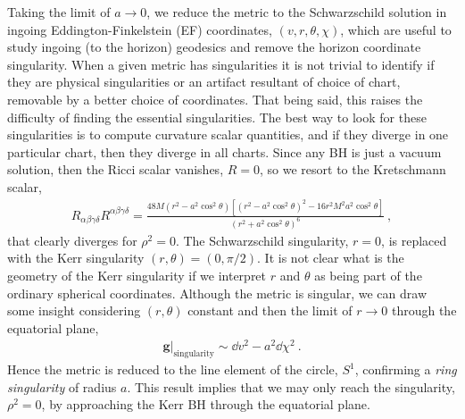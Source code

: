 Taking the limit of $a\to0$, we reduce the metric to the Schwarzschild solution in ingoing Eddington-Finkelstein (EF) coordinates, $(v,r,\theta,\chi)$, which are useful to study ingoing (to the horizon) geodesics and remove the horizon coordinate singularity.
When a given metric has singularities it is not trivial to identify if they are physical singularities or an artifact resultant of choice of chart, removable by a better choice of coordinates. 
That being said, this raises the difficulty of finding the essential singularities.
The best way to look for these singularities is to compute curvature scalar quantities, and if they diverge in one particular chart, then they diverge in all charts.
Since any BH is just a vacuum solution, then the Ricci scalar vanishes, $R=0$, so we resort to the Kretschmann scalar,
\begin{align}
    R_{\alpha\beta\gamma\delta} R^{\alpha\beta\gamma\delta} = \frac{48 M (r^2 - a^2\cos^2\theta) \left[ (r^2 - a^2\cos^2\theta) ^2 - 16 r^2 M^2 a^2\cos^2\theta \right] }{(r^2 + a^2\cos^2\theta)^6} ~,
    \label{eq2:KerrKretschmann}
\end{align}
that clearly diverges for $\rho^2=0$.
The Schwarzschild singularity, $r=0$, is replaced with the Kerr singularity $(r,\theta)=(0,\pi/2)$.
It is not clear what is the geometry of the Kerr singularity if we interpret $r$ and $\theta$ as being part of the ordinary spherical coordinates.
Although the metric is singular, we can draw some insight considering $(r,\theta)$ constant and then the limit of $r\to0$ through the equatorial plane,
\begin{align}
    {\bm{g}}\rvert_{\mathrm{singularity}} \sim \dd v^2 - a^2 \dd \chi^2 ~.
    \label{eq2:KerrKretschmann}
\end{align}
Hence the metric is reduced to the line element of the circle, $S^1$, confirming a \emph{ring singularity} of radius $a$.
This result implies that we may only reach the singularity, $\rho^2=0$, by approaching the Kerr BH through the equatorial plane. 

